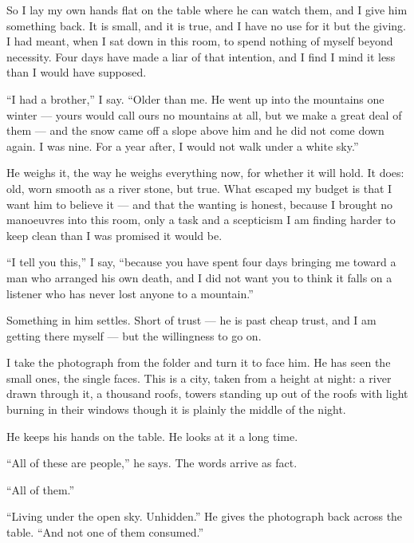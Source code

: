 So I lay my own hands flat on the table where he can watch them, and I give him something back. It is small, and it is true, and I have no use for it but the giving. I had meant, when I sat down in this room, to spend nothing of myself beyond necessity. Four days have made a liar of that intention, and I find I mind it less than I would have supposed.\par

``I had a brother,'' I say. ``Older than me. He went up into the mountains one winter --- yours would call ours no mountains at all, but we make a great deal of them --- and the snow came off a slope above him and he did not come down again. I was nine. For a year after, I would not walk under a white sky.''\par

He weighs it, the way he weighs everything now, for whether it will hold. It does: old, worn smooth as a river stone, but true. What escaped my budget is that I want him to believe it --- and that the wanting is honest, because I brought no manoeuvres into this room, only a task and a scepticism I am finding harder to keep clean than I was promised it would be.\par

``I tell you this,'' I say, ``because you have spent four days bringing me toward a man who arranged his own death, and I did not want you to think it falls on a listener who has never lost anyone to a mountain.''\par

Something in him settles. Short of trust --- he is past cheap trust, and I am getting there myself --- but the willingness to go on.\par

I take the photograph from the folder and turn it to face him. He has seen the small ones, the single faces. This is a city, taken from a height at night: a river drawn through it, a thousand roofs, towers standing up out of the roofs with light burning in their windows though it is plainly the middle of the night.\par

He keeps his hands on the table. He looks at it a long time.\par

``All of these are people,'' he says. The words arrive as fact.\par

``All of them.''\par

``Living under the open sky. Unhidden.'' He gives the photograph back across the table. ``And not one of them consumed.''\par


